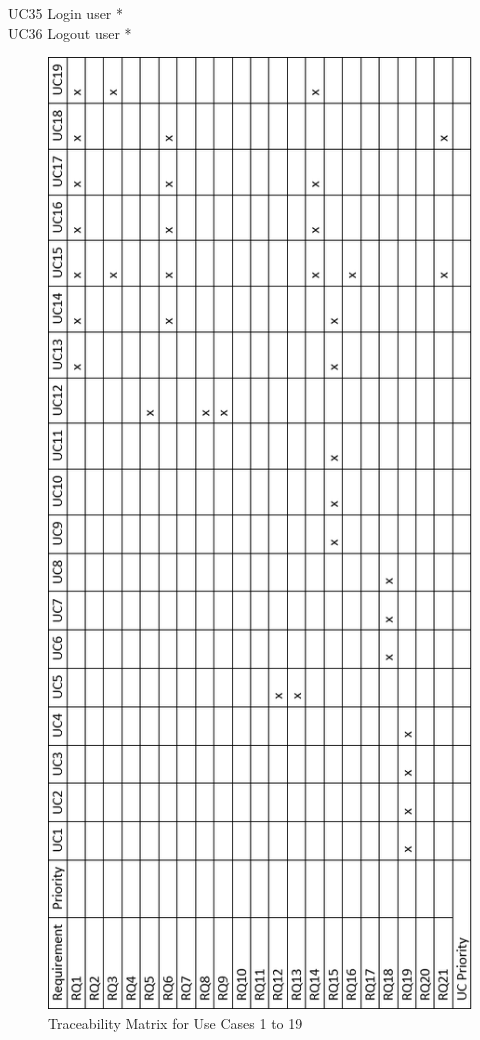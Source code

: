 \documentclass{article}
\begin{document}
{			UC35 Login user *\\
			UC36 Logout user *\\
			\newpage
			\vfill
			\begin{figure}[!h]
				\vspace{-3cm}
				\includegraphics[scale=0.70]{Traceability_Matrix_1}
				\caption{Traceability Matrix for Use Cases 1 to 19}
			\end{figure}
			
}
\end{document}
